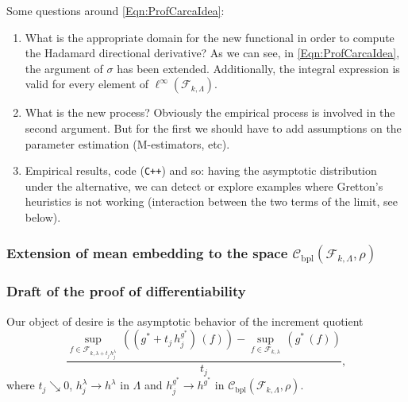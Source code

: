	Some questions around \eqref{Eqn:ProfCarcaIdea}:
	\begin{enumerate}
		\item What is the appropriate domain for the new functional in order to compute the Hadamard directional derivative? As we can see, in \eqref{Eqn:ProfCarcaIdea}, the argument of $\sigma$ has been extended. Additionally, the integral expression is valid for every element of $\ell^{\infty}\left(\mathcal{F}_{k,\Lambda}\right)$.
		\item What is the new process? Obviously the empirical process is involved in the second argument. But for the first we should have to add assumptions on the parameter estimation (M-estimators, etc).
		\item Empirical results, code (\verb!C++!) and so: having the asymptotic distribution under the alternative, we can detect or explore examples where Gretton's heuristics is not working (interaction between the two terms of the limit, see below).
	\end{enumerate}
		\subsubsection*{Extension of mean embedding to the space $\mathcal{C}_{\operatorname{bpl}}\left(\mathcal{F}_{k,\Lambda},\rho\right)$}
		\subsubsection*{Draft of the proof of differentiability}
			Our object of desire is the asymptotic behavior of the increment quotient
			\begin{equation}
				\frac{\underset{f\in\mathcal{F}_{k,\lambda+t_{j}\,h_{j}^{\lambda}}}{\operatorname{sup}}\,\left(\left(g^{\ast}+t_{j}\,h_{j}^{g^{\ast}}\right)\,(f)\right)-\underset{f\in\mathcal{F}_{k,\lambda}}{\operatorname{sup}}\,\left(g^{\ast}\,(f)\right)}{t_{j}},
			\end{equation}
			where $t_{j}\searrow0$, $h_{j}^{\lambda}\longrightarrow h^{\lambda}$ in $\Lambda$ and $h_{j}^{g^{\ast}}\longrightarrow h^{g^{\ast}}$ in $\mathcal{C}_{\operatorname{bpl}}\left(\mathcal{F}_{k,\Lambda},\rho\right)$.